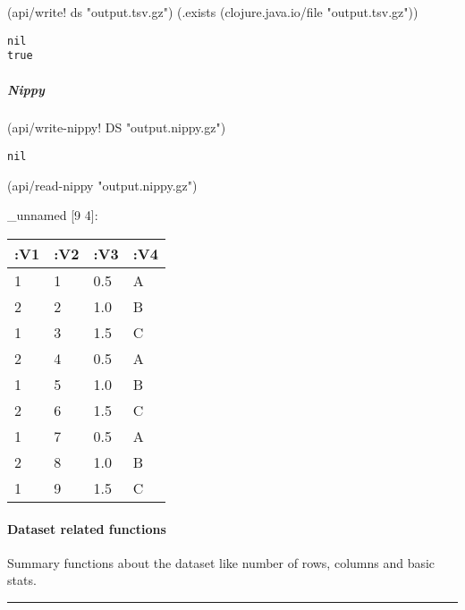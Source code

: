 \documentclass[]{article}
\newenvironment{Shaded}{\begin{snugshade}}{\end{snugshade}}
\newcommand{\NormalTok}[1]{#1}
\newcommand{\StringTok}[1]{\textcolor[rgb]{0.31,0.60,0.02}{#1}}
\let\oldparagraph\paragraph
\renewcommand{\paragraph}[1]{\oldparagraph{#1}\mbox{}}
\let\oldsubparagraph\subparagraph
\renewcommand{\subparagraph}[1]{\oldsubparagraph{#1}\mbox{}}
\begin{document}
\begin{Shaded}
\begin{Highlighting}[]
\NormalTok{(api/write! ds }\StringTok{"output.tsv.gz"}\NormalTok{)}
\NormalTok{(.exists (clojure.java.io/file }\StringTok{"output.tsv.gz"}\NormalTok{))}
\end{Highlighting}
\end{Shaded}

\begin{verbatim}
nil
true
\end{verbatim}

\hypertarget{nippy}{%
\subparagraph{Nippy}\label{nippy}}

\begin{Shaded}
\begin{Highlighting}[]
\NormalTok{(api/write-nippy! DS }\StringTok{"output.nippy.gz"}\NormalTok{)}
\end{Highlighting}
\end{Shaded}

\begin{verbatim}
nil
\end{verbatim}

\begin{Shaded}
\begin{Highlighting}[]
\NormalTok{(api/read-nippy }\StringTok{"output.nippy.gz"}\NormalTok{)}
\end{Highlighting}
\end{Shaded}

\_unnamed {[}9 4{]}:

\begin{longtable}[]{@{}llll@{}}
\toprule
:V1 & :V2 & :V3 & :V4\tabularnewline
\midrule
\endhead
1 & 1 & 0.5 & A\tabularnewline
2 & 2 & 1.0 & B\tabularnewline
1 & 3 & 1.5 & C\tabularnewline
2 & 4 & 0.5 & A\tabularnewline
1 & 5 & 1.0 & B\tabularnewline
2 & 6 & 1.5 & C\tabularnewline
1 & 7 & 0.5 & A\tabularnewline
2 & 8 & 1.0 & B\tabularnewline
1 & 9 & 1.5 & C\tabularnewline
\bottomrule
\end{longtable}

\hypertarget{dataset-related-functions}{%
\paragraph{Dataset related functions}\label{dataset-related-functions}}

Summary functions about the dataset like number of rows, columns and
basic stats.

\begin{center}\rule{0.5\linewidth}{0.5pt}\end{center}
\end{document}
